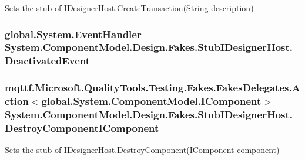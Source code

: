 Sets the stub of I\-Designer\-Host.\-Create\-Transaction(\-String description)

\hypertarget{class_system_1_1_component_model_1_1_design_1_1_fakes_1_1_stub_i_designer_host_af269dcc059d5c963444ddf9af5ecbcf5}{
\subsubsection[{Deactivated\-Event}]{\setlength{\rightskip}{0pt plus 5cm}global.\-System.\-Event\-Handler System.\-Component\-Model.\-Design.\-Fakes.\-Stub\-I\-Designer\-Host.\-Deactivated\-Event}}\label{class_system_1_1_component_model_1_1_design_1_1_fakes_1_1_stub_i_designer_host_af269dcc059d5c963444ddf9af5ecbcf5}
\hypertarget{class_system_1_1_component_model_1_1_design_1_1_fakes_1_1_stub_i_designer_host_a025b590b4f5314c0f764c6f51a7a849a}{
\subsubsection[{Destroy\-Component\-I\-Component}]{\setlength{\rightskip}{0pt plus 5cm}mqttf.\-Microsoft.\-Quality\-Tools.\-Testing.\-Fakes.\-Fakes\-Delegates.\-Action$<$global.\-System.\-Component\-Model.\-I\-Component$>$ System.\-Component\-Model.\-Design.\-Fakes.\-Stub\-I\-Designer\-Host.\-Destroy\-Component\-I\-Component}}\label{class_system_1_1_component_model_1_1_design_1_1_fakes_1_1_stub_i_designer_host_a025b590b4f5314c0f764c6f51a7a849a}


Sets the stub of I\-Designer\-Host.\-Destroy\-Component(\-I\-Component component)

